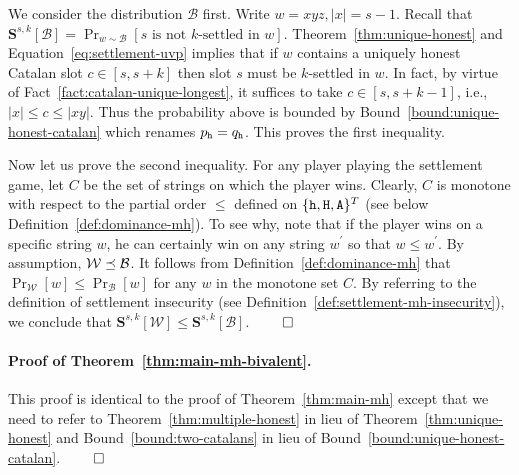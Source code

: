   We consider the distribution $\mathcal{B}$ first. 
  Write $w = xyz, |x| = s - 1$.
  Recall that  
  $
    \mathbf{S}^{s,k}[\mathcal{B}] 
    = \Pr_{w \sim \mathcal{B}}[\text{$s$ is not $k$-settled in $w$}]
  $. 
  Theorem~\ref{thm:unique-honest} and Equation~\eqref{eq:settlement-uvp} implies that 
  if $w$ contains a uniquely honest Catalan slot $c \in [s, s + k]$ 
  then slot $s$ must be $k$-settled in $w$. 
  In fact, by virtue of Fact~\ref{fact:catalan-unique-longest}, 
  it suffices to take $c \in [s, s + k - 1]$, 
  i.e., $|x| \leq c \leq |xy|$. 
  Thus the probability above is bounded by 
  Bound~\ref{bound:unique-honest-catalan} 
  which renames $p_{\mathtt{h}} = q_{\mathtt{h}}$.
  This proves the first inequality. 
  
  Now let us prove the second inequality. 
  For any player playing the settlement game, 
  let $C$ be the set of strings on which the player wins. 
  Clearly, $C$ is monotone 
  with respect to the partial order $\leq$ 
  defined on $\{\mathtt{h}, \mathtt{H}, \mathtt{A}\}^T$ 
  (see below Definition~\ref{def:dominance-mh}).  
  To see why, note that if the player wins 
  on a specific string $w$, 
  he can certainly win on any string $w^\prime$ so that $w \leq w^\prime$. 
  By assumption, 
  $\mathcal{W} \preceq \mathcal{B}$. 
  It follows from Definition~\ref{def:dominance-mh} that 
  $\Pr_{\mathcal{W}}[w] \leq \Pr_{\mathcal{B}}[w]$ 
  for any $w$ in the monotone set $C$. 
  By referring to the definition of settlement insecurity 
  (see Definition~\ref{def:settlement-mh-insecurity}), 
  we conclude that 
  $
    \mathbf{S}^{s,k}[\mathcal{W}] \leq \mathbf{S}^{s,k}[\mathcal{B}]
  $.
  \hfill $\qed$  

\paragraph{Proof of Theorem~\ref{thm:main-mh-bivalent}.}
  This proof is identical to the proof of Theorem~\ref{thm:main-mh} 
  except that 
  we need to refer to Theorem~\ref{thm:multiple-honest} in lieu of Theorem~\ref{thm:unique-honest}
  and Bound~\ref{bound:two-catalans} in lieu of Bound~\ref{bound:unique-honest-catalan}.
  \hfill $\qed$  



